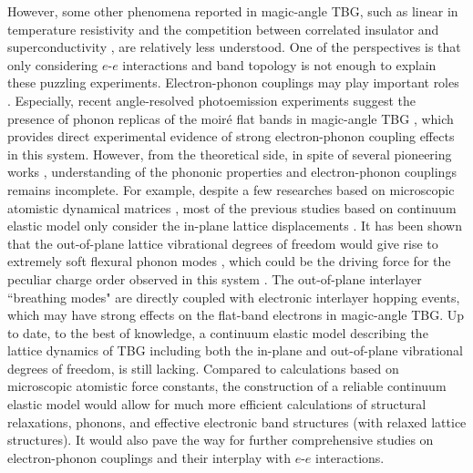 \documentclass[aps,prx,10pt,twocolumn,superscriptaddress]{revtex4}
\begin{document}
However, some other phenomena reported in magic-angle TBG, such as linear in temperature resistivity \cite{young-linear-np19,cao-strange-prl20} and the competition between  correlated insulator  and  superconductivity \cite{young-tbg-np20,li-tbg-science21}, are relatively less understood. One of the perspectives is that only considering $e$-$e$ interactions and band topology is not enough to explain these puzzling experiments. Electron-phonon couplings may play important roles \cite{wu-prl18, lian-tbg-prl19, sharma-tbg-phonon-nc21}. Especially, recent angle-resolved photoemission experiments suggest the presence of phonon replicas of the moir\'e flat bands in magic-angle TBG \cite{chen-replica-arxiv23}, which provides direct experimental evidence of strong electron-phonon coupling effects in this system.  
 However, from the theoretical side, in spite of several pioneering works \cite{tbg-phonon-nature21,balandin-prb13,choi-prb18,wu-prl18,lian-tbg-prl19,tbg-raman-nc18,wu-linear-prb19,angeli-tbg-prx19,koshino-phonon-prb19,koshino-ep-prb20,sharma-tbg-phonon-nc21,choi-tbg-prl21,eliel2018intralayer,lamparski2020soliton,liu-phonon-nano22,kaxiras-phonon-prb22,DaiXi-phonon-2023prb},  understanding of the phononic properties and electron-phonon couplings  remains incomplete. For example, despite a few researches based on microscopic atomistic dynamical matrices \cite{angeli-prx19,liu-phonon-nano22,DaiXi-phonon-2023prb}, most of the previous studies based on continuum elastic model only consider the in-plane lattice displacements \cite{koshino-tbg-prb17,koshino-phonon-prb19,koshino-ep-prb20,carr-relaxation-18prb,lamparski2020soliton}.  It has been shown that the out-of-plane lattice vibrational degrees of freedom would give rise to extremely soft flexural phonon modes \cite{liu-phonon-nano22}, which could be the driving force for the peculiar charge order observed in this system \cite{liu-phonon-nano22, tbg-stm-andrei19}.  The out-of-plane interlayer ``breathing modes" \cite{he-breathing-nano13} are directly coupled with electronic interlayer hopping events, which may have strong effects on the flat-band electrons in magic-angle TBG. Up to date, to the best of knowledge, a continuum elastic model describing the lattice dynamics of TBG including both the in-plane and out-of-plane vibrational degrees of freedom, is still lacking.  Compared to calculations based on  microscopic atomistic force constants,  the construction of a reliable continuum elastic model would allow for much more efficient calculations of structural relaxations, phonons, and effective electronic band structures (with relaxed lattice structures). It would also pave the way for further comprehensive studies on electron-phonon couplings and their interplay with $e$-$e$ interactions.
\end{document}
